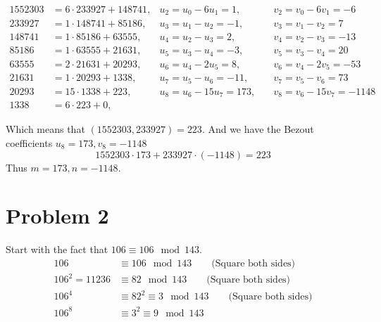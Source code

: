 \documentclass{article}
\begin{document}
\begin{align*}
   1552303 &= 6 \cdot 233927 + 148741, & u_2 = u_0 - 6u_1 = 1, \quad & v_2 = v_0 - 6v_1 = -6 \\
   233927 &= 1 \cdot 148741 + 85186, & u_3 = u_1 - u_2 = -1, \quad & v_3 = v_1 - v_2 = 7 \\
   148741 &= 1 \cdot 85186 + 63555, & u_4 = u_2 - u_3 = 2, \quad & v_4 = v_2 - v_3 = -13 \\
   85186 &= 1 \cdot 63555 + 21631, & u_5 = u_3 - u_4 = -3, \quad & v_5 = v_3 - v_4 = 20 \\
   63555 &= 2 \cdot 21631 + 20293, & u_6 = u_4 - 2u_5 = 8, \quad & v_6 = v_4 - 2v_5 = -53 \\
   21631 &= 1 \cdot 20293 + 1338, & u_7 = u_5 - u_6 = -11, \quad & v_7 = v_5 - v_6 = 73 \\
   20293 &= 15 \cdot 1338 + 223, & u_8 = u_6 - 15u_7 = 173, \quad & v_8 = v_6 - 15v_7 = -1148 \\
   1338 &= 6 \cdot 223 + 0, & &
\end{align*}

Which means that \((1552303, 233927) = 223\). And we have the Bezout coefficients \(u_8 = 173, v_8 = -1148\)
\[
   1552303 \cdot 173 + 233927 \cdot (-1148) = 223
\]
Thus \(m = 173, n = -1148\).

\section*{Problem 2}



Start with the fact that \(106 \equiv 106 \mod 143\).
\begin{align*}
   106 &\equiv 106 \mod 143 \qquad \text{(Square both sides)} \\
   106^2 = 11236 &\equiv 82 \mod 143 \qquad \text{(Square both sides)} \\
   106^4 &\equiv 82^2 \equiv 3 \mod 143 \qquad \text{(Square both sides)} \\
   106^8 &\equiv 3^2 \equiv 9 \mod 143 \\
\end{align*}
\end{document}
